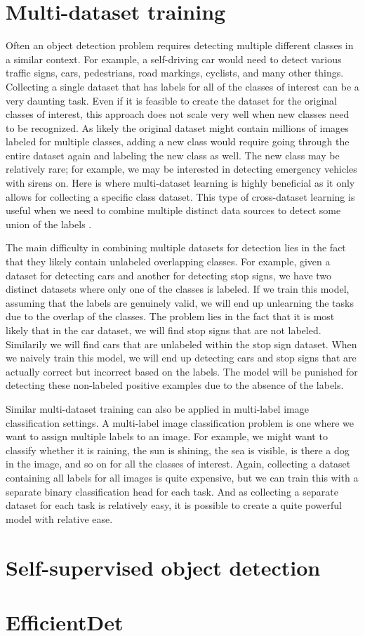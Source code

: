 \section{Multi-dataset training}
Often an object detection problem requires detecting multiple different classes in a similar context.
For example, a self-driving car would need to detect various traffic signs, cars, pedestrians, road markings, cyclists, and many other things.
Collecting a single dataset that has labels for all of the classes of interest can be a very daunting task.
Even if it is feasible to create the dataset for the original classes of interest, this approach does not scale very well when new classes need to be recognized.
As likely the original dataset might contain millions of images labeled for multiple classes, adding a new class would require going through the entire dataset again and labeling the new class as well.
The new class may be relatively rare; for example, we may be interested in detecting emergency vehicles with sirens on.
Here is where multi-dataset learning is highly beneficial as it only allows for collecting a specific class dataset.
This type of cross-dataset learning is useful when we need to combine multiple distinct data sources to detect some union of the labels \citep{cross_data}.

The main difficulty in combining multiple datasets for detection lies in the fact that they likely contain unlabeled overlapping classes.
For example, given a dataset for detecting cars and another for detecting stop signs, we have two distinct datasets where only one of the classes is labeled.
If we train this model, assuming that the labels are genuinely valid, we will end up unlearning the tasks due to the overlap of the classes.
The problem lies in the fact that it is most likely that in the car dataset, we will find stop signs that are not labeled.
Similarily we will find cars that are unlabeled within the stop sign dataset.
When we naively train this model, we will end up detecting cars and stop signs that are actually correct but incorrect based on the labels.
The model will be punished for detecting these non-labeled positive examples due to the absence of the labels.

Similar multi-dataset training can also be applied in multi-label image classification settings.
A multi-label image classification problem is one where we want to assign multiple labels to an image.
For example, we might want to classify whether it is raining, the sun is shining, the sea is visible, is there a dog in the image, and so on for all the classes of interest.
Again, collecting a dataset containing all labels for all images is quite expensive, but we can train this with a separate binary classification head for each task.
And as collecting a separate dataset for each task is relatively easy, it is possible to create a quite powerful model with relative ease.

\section{Self-supervised object detection}

\section{EfficientDet}